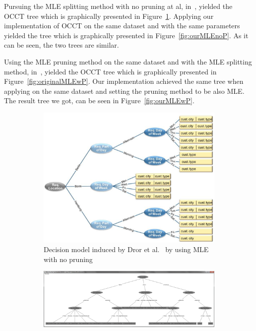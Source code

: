 \documentclass[a4paper,12pt]{article}
\begin{document}
\begin{spacing}{1.5}
Pursuing the MLE splitting method with no pruning at al, in~\cite{dror2011thesis}, yielded the OCCT tree which is graphically presented in Figure~\ref{fig:originalMLEnoP}. Applying our implementation of OCCT on the same dataset and with the same parameters yielded the tree which is graphically presented in Figure~\ref{fig:ourMLEnoP}. As it can be seen, the two trees are similar.

Using the MLE pruning method on the same dataset and with the MLE splitting method, in~\cite{dror2011thesis}, yielded the OCCT tree which is graphically presented in Figure~\ref{fig:originalMLEwP}. Our implementation achieved the same tree when applying on the same dataset and setting the pruning method to be also MLE. The result tree we got, can be seen in Figure~\ref{fig:ourMLEwP}.
\pagebreak
\begin{figure}[!h]
    \centering
    \begin{subfigure}{\linewidth}        
        \vspace*{1cm}
        \centering
        \includegraphics[width=1\textwidth]{Figures/Eval/PDF/MaayanMLEnoP.pdf}
        \caption{Decision model induced by Dror et al.~\cite{dror2011thesis} by using MLE with no pruning}\label{fig:originalMLEnoP}
        \vspace*{2cm}
    \end{subfigure}
    \begin{subfigure}{\linewidth}
        \centering
        \includegraphics[width=1\textwidth]{Figures/Eval/PDF/OurMLEnoP.pdf}

\end{subfigure}
\end{figure}
\end{spacing}
\end{document}
